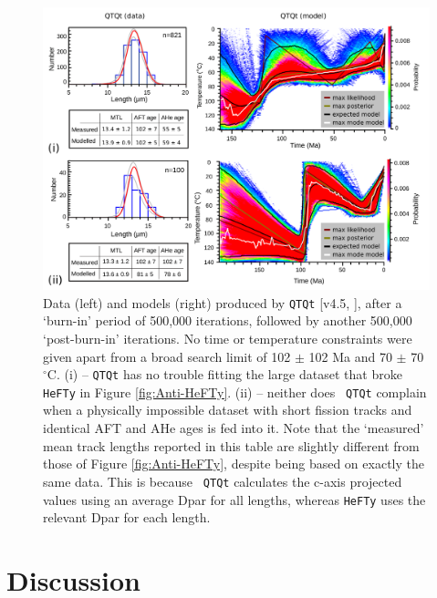 \documentclass{article}
\begin{document}
\begin{figure}[!ht]
\centering
\includegraphics[width=\textwidth]{fig8.png}
\caption{Data (left) and models (right) produced by {\tt QTQt}
  [v4.5, \cite{gallagher2012}], after a `burn-in' period of 500,000
  iterations, followed by another 500,000 `post-burn-in' iterations.
  No time or temperature constraints were given apart from a broad
  search limit of 102 $\pm$ 102 Ma and 70 $\pm$ 70 $^\circ$C.  (i) --
  {\tt QTQt} has no trouble fitting the large dataset that broke {\tt
    HeFTy} in Figure \ref{fig:Anti-HeFTy}.  (ii) -- neither does {\tt
    QTQt} complain when a physically impossible dataset with short
  fission tracks and identical AFT and AHe ages is fed into it. Note
  that the `measured' mean track lengths reported in this table are
  slightly different from those of Figure \ref{fig:Anti-HeFTy},
  despite being based on exactly the same data.  This is because {\tt
    QTQt} calculates the c-axis projected values using an average Dpar
  for all lengths, whereas {\tt HeFTy} uses the relevant Dpar for each
  length.}
\label{fig:Anti-QTQt}
\end{figure}

\section{Discussion}
\label{sec:discussion}
\end{document}
